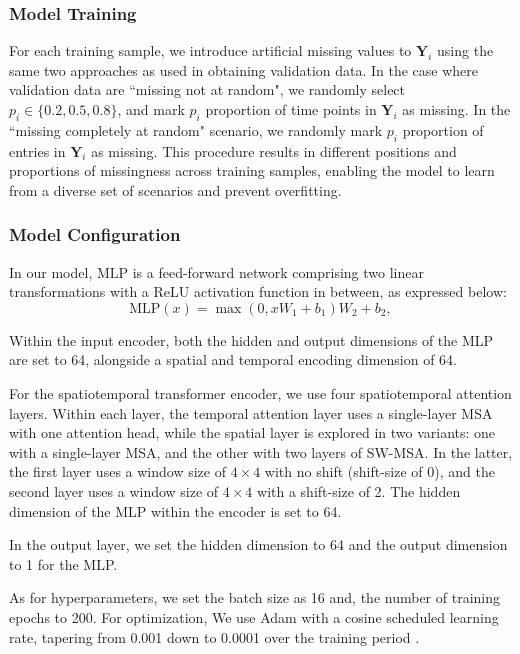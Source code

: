 \documentclass[review]{elsarticle}
\begin{document}
\subsubsection*{Model Training}
For each training sample, we introduce artificial missing values to $\boldsymbol{Y}_i$ using the same two approaches as used in obtaining validation data. In the case where validation data are ``missing not at random", we randomly select $p_i \in \{0.2, 0.5, 0.8\}$, and mark $p_i$ proportion of time points in $\boldsymbol{Y}_i$ as missing. In the ``missing completely at random" scenario, we randomly mark $p_i$ proportion of entries in $\boldsymbol{Y}_i$ as missing. This procedure results in different positions and proportions of missingness across training samples, enabling the model to learn from a diverse set of scenarios and prevent overfitting.



\subsubsection*{Model Configuration}
In our model, $\text{MLP}$ is a feed-forward network comprising two linear transformations with a ReLU activation function in between, as expressed below:
\begin{equation}
    \text{MLP}(x)= \max (0, xW_1+b_1)W_2+b_2,
\end{equation}

Within the input encoder, both the hidden and output dimensions of the MLP are set to 64, alongside a spatial and temporal encoding dimension of 64. 

For the spatiotemporal transformer encoder, we use four spatiotemporal attention layers. Within each layer, the temporal attention layer uses a single-layer MSA with one attention head, while the spatial layer is explored in two variants: one with a single-layer MSA, and the other with two layers of SW-MSA. In the latter, the first layer uses a window size of $4\times 4$ with no shift (shift-size of 0), and the second layer uses a window size of $4 \times 4$ with a shift-size of 2. The hidden dimension of the MLP within the encoder is set to 64. 

In the output layer, we set the hidden dimension to 64 and the output dimension to 1 for the MLP. 

As for hyperparameters, we set the batch size as 16 and, the number of training epochs to 200. For optimization, We use Adam with a cosine scheduled learning rate, tapering from 0.001 down to 0.0001 over the training period \citep{kingma2014adam}.
\end{document}
